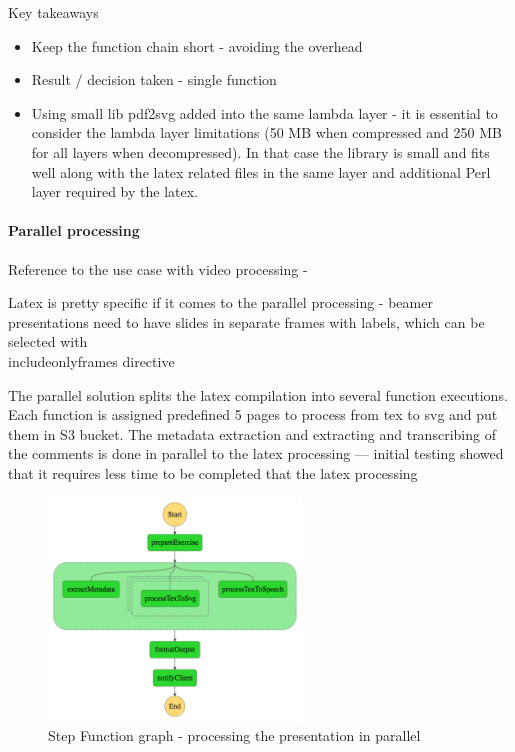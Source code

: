 Key takeaways

\begin{itemize}
    \item Keep the function chain short - avoiding the overhead
    \item Result / decision taken - single function
    \item Using small lib pdf2svg added into the same lambda layer - it is essential to consider the lambda layer limitations (50 MB when compressed and 250 MB for all layers when decompressed). In that case the library is small and fits well along with the latex related files in the same layer and additional Perl layer required by the latex.
\end{itemize}

\paragraph{Parallel processing}

Reference to the use case with video processing - \cite{ServerlessArchitectureOnAWSSecondEdition}

Latex is pretty specific if it comes to the parallel processing - beamer presentations need to have slides in separate frames with labels, which can be selected with \\includeonlyframes directive

The parallel solution splits the latex compilation into several function executions. Each function is assigned predefined 5 pages to process from tex to svg and put them in S3 bucket. The metadata extraction and extracting and transcribing of the comments is done in parallel to the latex processing --- initial testing showed that it requires less time to be completed that the latex processing

\begin{figure}[H]
    \centering
    \includegraphics[width=0.6\textwidth]{assets/04-serverless-for-web-apps/stepFunctionGraphParallel.png}
    \caption{Step Function graph - processing the presentation in parallel}
    \label{fig:step-function-processing-the-presentation-in-parallel}
\end{figure}

